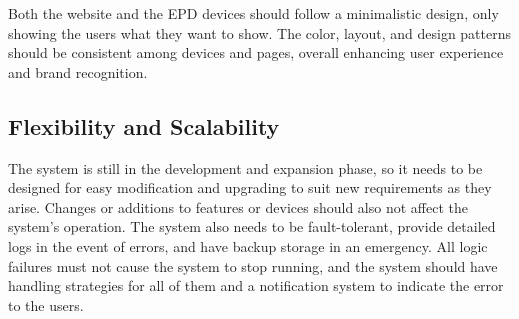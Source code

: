 \documentclass[../Main.tex]{subfiles}
\begin{document}
Both the website and the \gls{EPD} devices should follow a minimalistic design, only showing the users what they want to show. The color, layout, and design patterns should be consistent among devices and pages, overall enhancing user experience and brand recognition.

\subsection{Flexibility and Scalability}
The system is still in the development and expansion phase, so it needs to be designed for easy modification and upgrading to suit new requirements as they arise. Changes or additions to features or devices should also not affect the system's operation. The system also needs to be fault-tolerant, provide detailed logs in the event of errors, and have backup storage in an emergency. All logic failures must not cause the system to stop running, and the system should have handling strategies for all of them and a notification system to indicate the error to the users.
\end{document}
